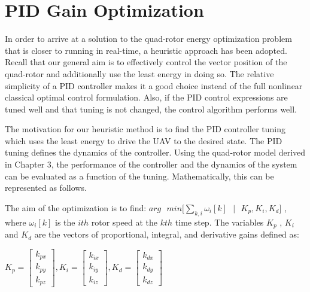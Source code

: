 
\chapter{PID Gain Optimization} %

\label{Chapter7} %



In order to arrive at a solution to the quad-rotor energy optimization problem that is closer to running in real-time, a heuristic approach has been adopted. Recall that our general aim is to effectively control the vector position of the quad-rotor and additionally use the least energy in doing so. The relative simplicity of a PID controller makes it a good choice instead of the full nonlinear classical optimal control formulation. Also, if the PID control expressions are tuned well and that tuning is not changed, the control algorithm performs well.

The motivation for our heuristic method is to find the PID controller tuning which uses the least energy to drive the UAV to the desired state. The PID tuning defines the dynamics of the controller. Using the quad-rotor model derived in Chapter 3, the performance of the controller and the dynamics of the system can be evaluated as a function of the tuning. Mathematically, this can be represented as follows.

The aim of the optimization is to find: $ arg\text{ }min \big[  \sum_{k,i} \omega_i[k] \text{ } | \text{ } K_p , K_i , K_d  \big]  $ , where $\omega_i[k]$ is the $ith$ rotor speed at the $kth$ time step. The variables $K_p$ , $K_i$ and $K_d$ are the vectors of proportional, integral, and derivative gains defined as:

\begin{center}
$ K_p = \left[ \begin{array}{c} k_{px} \\ k_{py} \\ k_{pz}  \end{array} \right] , K_i = \left[ \begin{array}{c} k_{ix} \\ k_{iy} \\ k_{iz}  \end{array} \right], K_d = \left[ \begin{array}{c} k_{dx} \\ k_{dy} \\ k_{dz}  \end{array} \right] $
\end{center}

